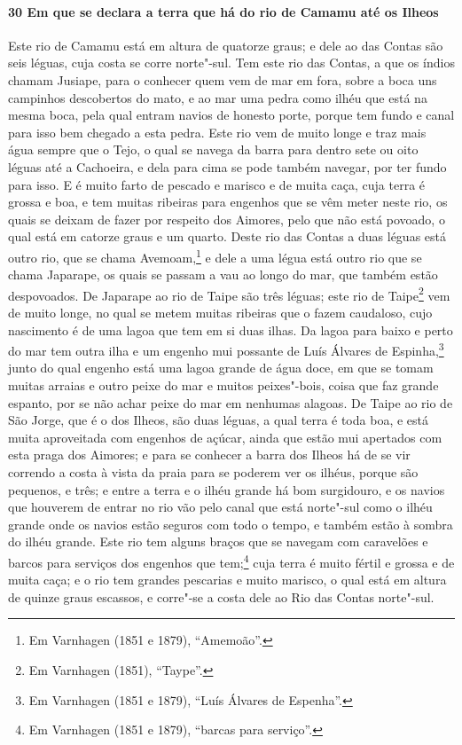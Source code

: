 \begin{linenumbers}
\paragraph{30 Em que se declara a terra que há do rio de Camamu até os Ilheos} \quad
Este rio de Camamu está em altura de quatorze graus; e dele ao das Contas são seis léguas,
cuja costa se corre norte"-sul. Tem este rio das Contas, a que os índios chamam Jusiape,
para o conhecer quem vem de mar em fora, sobre a boca uns campinhos descobertos do mato, e
ao mar uma pedra como ilhéu que está na mesma boca, pela qual entram navios de honesto
porte, porque tem fundo e canal para isso bem chegado a esta pedra. Este rio vem de muito
longe e traz mais água sempre que o Tejo, o qual se navega da barra para dentro sete ou
oito léguas até a Cachoeira, e dela para cima se pode também navegar, por ter fundo para
isso. E é muito farto de pescado e marisco e de muita caça, cuja terra é grossa e boa, e
tem muitas ribeiras para engenhos que se vêm meter neste rio, os quais se deixam de fazer
por respeito dos Aimores, pelo que não está povoado, o qual está em catorze graus e um
quarto. Deste rio das Contas a duas léguas está outro rio, que se chama Avemoam,\footnote{
Em Varnhagen (1851 e 1879), ``Amemoão''.} e dele a uma légua está outro rio que se chama
Japarape, os quais se passam a vau ao longo do mar, que também estão despovoados. De
Japarape ao rio de Taipe são três léguas; este rio de Taipe\footnote{ Em Varnhagen (1851),
``Taype''.} vem de muito longe, no qual se metem muitas ribeiras que o fazem caudaloso,
cujo nascimento é de uma lagoa que tem em si duas ilhas. Da lagoa para baixo e perto do
mar tem outra ilha e um engenho mui possante de Luís Álvares de Espinha,\footnote{ Em
Varnhagen (1851 e 1879), ``Luís Álvares de Espenha''.} junto do qual engenho está uma
lagoa grande de água doce, em que se tomam muitas arraias e outro peixe do mar e muitos
peixes"-bois, coisa que faz grande espanto, por se não achar peixe do mar em nenhumas
alagoas. De Taipe ao rio de São Jorge, que é o dos Ilheos, são duas léguas, a qual terra é
toda boa, e está muita aproveitada com engenhos de açúcar, ainda que estão mui apertados
com esta praga dos Aimores; e para se conhecer a barra dos Ilheos há de se vir correndo a
costa à vista da praia para se poderem ver os ilhéus, porque são pequenos, e três; e entre
a terra e o ilhéu grande há bom surgidouro, e os navios que houverem de entrar no rio vão
pelo canal que está norte"-sul como o ilhéu grande onde os navios estão seguros com todo o
tempo, e também estão à sombra do ilhéu grande. Este rio tem alguns braços que se navegam
com caravelões e barcos para serviços dos engenhos que tem;\footnote{ Em Varnhagen (1851 e
1879), ``barcas para serviço''.} cuja terra é muito fértil e grossa e de muita caça; e o
rio tem grandes pescarias e muito marisco, o qual está em altura de quinze graus escassos,
e corre"-se a costa dele ao Rio das Contas norte"-sul.


\end{linenumbers}
